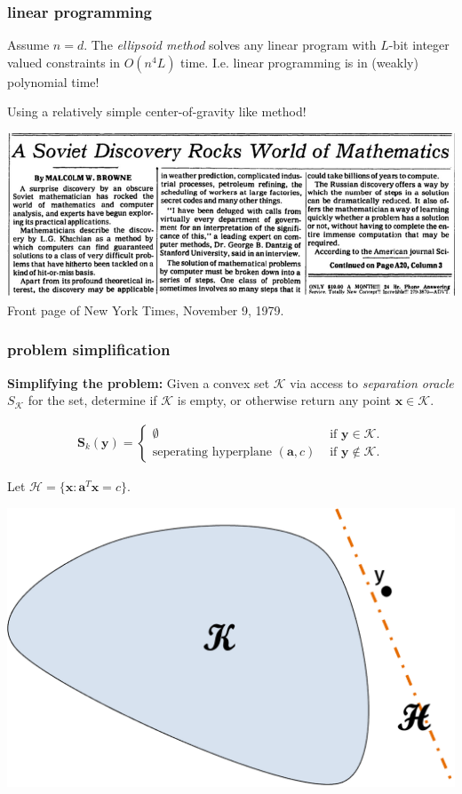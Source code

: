 \documentclass[compress]{beamer}
\newcommand{\bv}[1]{\mathbf{#1}}
\begin{document}
\begin{frame}[t]
	\frametitle{linear programming}
	\begin{theorem}[Khachiyan, 1979]
	Assume $n=d$. The \emph{ellipsoid method} solves any linear program with $L$-bit integer valued constraints in $O(n^4L)$ time. I.e. linear programming is in (weakly) polynomial time!
	\end{theorem}
Using a relatively simple center-of-gravity like method!
	\begin{center}
		\includegraphics[width=\textwidth]{ellipsoidnews.png}
		Front page of New York Times, November 9, 1979.
	\end{center}
\end{frame}

\begin{frame}[t]
	\frametitle{problem simplification}
	\small
		\textbf{Simplifying the problem:}
		Given a convex set $\mathcal{K}$ via access to \emph{separation oracle} $S_\mathcal{K}$ for the set, determine if $\mathcal{K}$ is empty, or otherwise return any point $\bv{x}\in \mathcal{K}$. 
		\vspace{-2em}
		
		\begin{align*}
			\bv{S}_k(\bv{y}) = \begin{cases}
				\emptyset &\text{ if } \bv{y} \in \mathcal{K}. \\
				\text{seperating hyperplane } (\bv{a},c) &\text{ if } \bv{y} \notin \mathcal{K}.
			\end{cases}
		\end{align*}
	
	Let $\mathcal{H} = \{\bv{x}: \bv{a}^T\bv{x} = c\}$.
	\vspace{-1em}
		\begin{center}
			\includegraphics[width=.65\textwidth]{seperationoracle.png}
		\end{center}
	
\end{frame}
\end{document}
